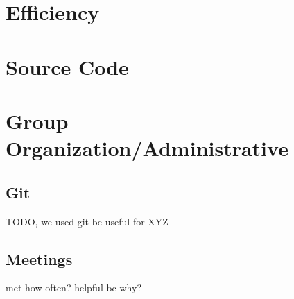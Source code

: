 \documentclass[titlepage]{article}
\begin{document}
	\section{Efficiency}
	
	\section{Source Code}
	
	\section{Group Organization/Administrative}
	
		\subsection{Git}
		TODO, we used git bc useful for XYZ

		\subsection{Meetings}
		met how often? helpful bc why?
	
\end{document}
